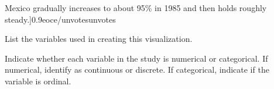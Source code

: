 {\begin{center}
Mexico gradually increases to about 95\% in 1985 and then holds roughly steady.]{0.9}{eoce/unvotes}{unvotes}
\end{center}
\begin{parts}
\item List the variables used in creating this visualization.
\item Indicate whether each variable in the study is numerical or categorical. 
If numerical, identify as continuous or discrete. If categorical, indicate if 
the variable is ordinal.
\end{parts}
}{}
